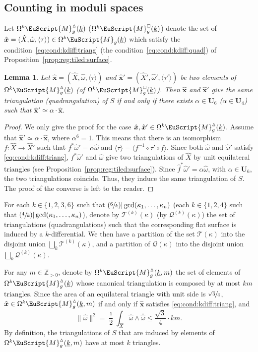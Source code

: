 \documentclass[10pt]{amsart}
\let\mathcal\EuScript
\newcommand{\Psfrac}[2]{(\sfrac{#1}{#2})}
\theoremstyle{plain}
\newtheorem{Lemma}[Theorem]{Lemma}
\theoremstyle{definition}
\newcommand\Z{\mathbb{Z}}
\newcommand{\Ub}{\mathbf{U}}
\newcommand{\Mcal}{\mathcal{M}}
\newcommand{\QQ}{\mathscr{Q}}
\newcommand{\TT}{\mathscr{T}}
\newcommand{\hX}{\hat{X}}
\newcommand{\homg}{\hat{\omega}}
\newcommand{\hf}{\hat{f}}
\newcommand{\hxx}{\hat{\boldsymbol{x}}}
\let\ol\overline
\let\ul\underline
\newcommand{\Skdiff}{\Omega^k\mathcal{M}_{g}(\ul{k})}
\newcommand{\Tkdiff}{\Omega^k\Mcal^\vartriangle_g(\ul{k})}
\newcommand{\Qkdiff}{\Omega^k\Mcal^{\scriptscriptstyle\square}_g(\ul{k})}
\newcommand{\Tkdiffm}{\Omega^k\Mcal^\vartriangle_g(\ul{k},m)}
\begin{document}
\subsection{Counting in moduli spaces}\label{sec:count:in:mod:sp}
Let $\Tkdiff$ (\resp $\Qkdiff$) denote the set of $\hxx=(\hX,\homg,\langle\tau\rangle)\in \Skdiff$ which satisfy the condition~\eqref{eq:cond:kdiff:triang} (\resp the condition~\eqref{eq:cond:kdiff:quad}) of Proposition~\ref{prop:reg:tiled:surface}.

\begin{Lemma}\label{lm:forms:same:triang}
Let $\hxx\!=\!(\hX,\homg,\langle \tau \rangle)$ and $\hxx{}'\!=\!(\hX',\homg',\langle \tau' \rangle)$ be two elements of $\Tkdiff$ (\resp of $\Qkdiff$).
Then $\hxx$ and $\hxx{}'$ give the same triangulation (\resp quadran\-gulation) of $S$ if and only if there exists $\alpha\in \Ub_6$ (\resp $\alpha\in \Ub_{4}$) such that $\hxx{}'\simeq\alpha\cdot\hxx$.
\end{Lemma}
\begin{proof}
We only give the proof for the case $\hxx,\hxx{}'\in\Tkdiff$.
Assume that $\hxx{}' \simeq\alpha\cdot\hxx$, where $\alpha^{6}=1$.
This means that there is an isomorphism $f: \hX \to \hX'$ such that $f^*\homg'=\alpha\homg$ and $\langle \tau\rangle=\langle f^{-1}\circ\tau'\circ f \rangle$. Since both $\homg$ and $\homg'$ satisfy \eqref{eq:cond:kdiff:triang}, $f^*\homg'$ and $\homg$ give two triangulations of $\hX$ by unit equilateral triangles (see Proposition~\ref{prop:reg:tiled:surface}). Since $\hf^*\homg'=\alpha\homg$, with $\alpha\in \Ub_6$, the two triangulations coincide. Thus, they induce the same triangulation of $S$. The proof of the converse is left to the reader.
\end{proof}

For each $k \in \{1,2,3,6\}$ such that $\Psfrac{6}{k} | \gcd(\kappa_1,\dots,\kappa_n)$ (\resp each $k\in \{1,2,4\}$ such that $\Psfrac{4}{k} | \gcd(\kappa_1,\dots,\kappa_n)$), denote by $\TT^{(k)}(\kappa)$ (\resp by $\QQ^{(k)}(\kappa)$) the set of triangulations (\resp quadrangulations) such that the corresponding flat surface is induced by a $k$-differential. We then have a partition of the set $\TT(\kappa)$ into the disjoint union $\bigsqcup_{k}\TT^{(k)}(\kappa)$, and a partition of $\QQ(\kappa)$ into the disjoint union $\bigsqcup_{k}\QQ^{(k)}(\kappa)$.

For any $m\in \Z_{>0}$, denote by $\Tkdiffm$ the set of elements of $\Tkdiff$ whose canonical triangulation is composed by at most $km$ triangles.
Since the area of an equilateral triangle with unit side is $\sfrac{\sqrt{3}}{4}$, $\hxx \in \Tkdiffm$ if and only if $\hxx$ satisfies \eqref{eq:cond:kdiff:triang}, and
\[
\|\homg\|^2=\frac{\imath}{2}\int_{\hX}\homg\wedge\ol{\homg} \leq \frac{\sqrt{3}}{4}\cdot km.
\]
By definition, the triangulations of $S$ that are induced by elements of $\Tkdiffm$ have at most $k$ triangles.
\end{document}
